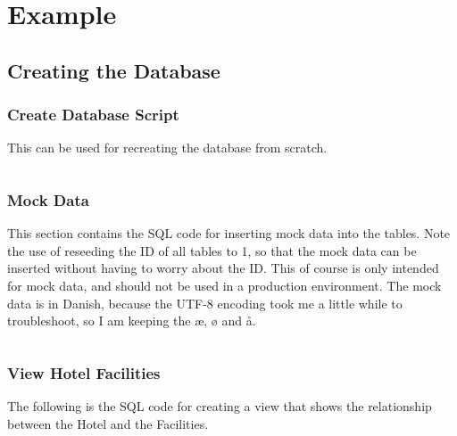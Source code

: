 \chapter{Example}

\section{Creating the Database}

\subsection{Create Database Script}
This can be used for recreating the database from scratch.
\inputminted{sql}{codefiles/CreateAllTabels.sql}


\subsection{Mock Data}
This section contains the SQL code for inserting mock data into the tables. 
Note the use of reseeding the ID of all tables to 1, so that the mock data can be inserted without having to worry about the ID.
This of course is only intended for mock data, and should not be used in a production environment.
The mock data is in Danish, because the UTF-8 encoding took me a little while to troubleshoot, so I am keeping the æ, ø and å.
\inputminted{sql}{codefiles/DanishMockData.sql}


\subsection{View Hotel Facilities}
The following is the SQL code for creating a view that shows the relationship between the Hotel and the Facilities.
\inputminted{sql}{codefiles/ViewHotelFacilities.sql}
\label{label:sql-view-hotel-facilities}


